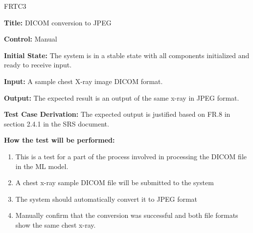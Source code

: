 \documentclass[12pt, titlepage]{article}
\begin{document}
\begin{itemize}
    \begin{item}
        FRTC3
        \begin{mdframed}[linewidth=0.5mm]
            \textbf{Title:} DICOM conversion to JPEG \par
            \textbf{Control:} Manual \par
            \textbf{Initial State:} The system is in a stable state with all components initialized and ready to receive input. \par
            \textbf{Input:} A sample chest X-ray image DICOM format. \par
            \textbf{Output:} The expected result is an output of the same x-ray in JPEG format. \par
            \textbf{Test Case Derivation:} The expected output is justified based on FR.8 in section 2.4.1 in the SRS document. \par
            \textbf{How the test will be performed:}
            \begin{enumerate}[noitemsep]
                \item This is a test for a part of the process involved in processing the DICOM file in the ML model.
                \item A chest x-ray sample DICOM file will be submitted to the system
                \item The system should automatically convert it to JPEG format
                \item Manually confirm that the conversion was successful and both file formats show the same chest x-ray.
            \end{enumerate}
        \end{mdframed}
    \end{item}
\end{itemize}
\end{document}
